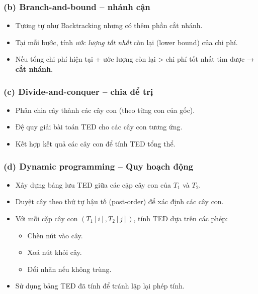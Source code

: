 \documentclass{article}
\begin{document}
	\subsubsection*{(b) Branch-and-bound -- nhánh cận}
	\begin{itemize}
		\item Tương tự như Backtracking nhưng có thêm phần cắt nhánh.
		\item Tại mỗi bước, tính \textit{ước lượng tốt nhất} còn lại (lower bound) của chi phí.
		\item Nếu tổng chi phí hiện tại + ước lượng còn lại > chi phí tốt nhất tìm được → \textbf{cắt nhánh}.
	\end{itemize}
	
	\subsubsection*{(c) Divide-and-conquer -- chia để trị}
	
	\begin{itemize}
		\item Phân chia cây thành các cây con (theo từng con của gốc).
		\item Đệ quy giải bài toán TED cho các cây con tương ứng.
		\item Kết hợp kết quả các cây con để tính TED tổng thể.
	\end{itemize}
	
	\subsubsection*{(d) Dynamic programming -- Quy hoạch động}
	
	\begin{itemize}
		\item Xây dựng bảng lưu TED giữa các cặp cây con của $T_1$ và $T_2$.
		\item Duyệt cây theo thứ tự hậu tố (post-order) để xác định các cây con.
		\item Với mỗi cặp cây con $(T_1[i], T_2[j])$, tính TED dựa trên các phép:
		\begin{itemize}
			\item Chèn nút vào cây.
			\item Xoá nút khỏi cây.
			\item Đổi nhãn nếu không trùng.
		\end{itemize}
		\item Sử dụng bảng TED đã tính để tránh lặp lại phép tính.
	\end{itemize}
	
\end{document}

